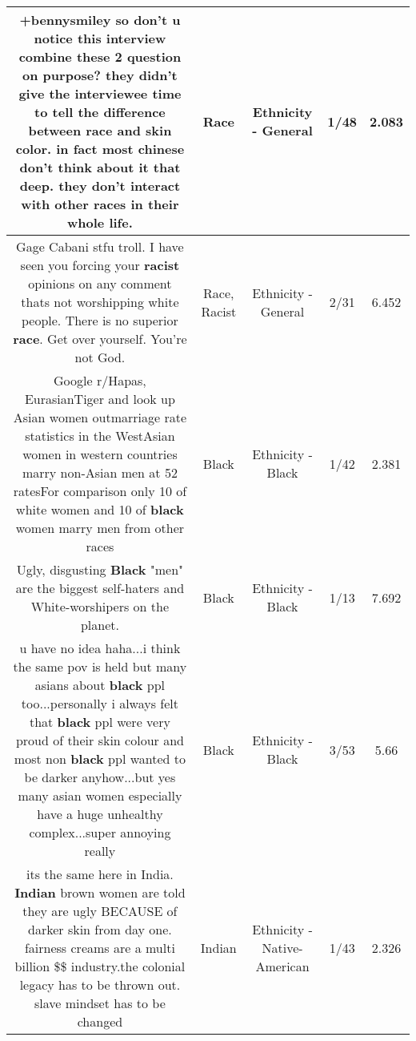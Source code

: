 \documentclass[11pt]{article}
\newlength\mylength
\begin{document}
\begin{center}
\begin{longtable}{|C{.65\mylength}|C{.30\mylength}|C{.12\mylength}|C{.12\mylength}|C{.12\mylength}|}
  \small +bennysmiley
    so don't u notice this interview combine these 2 question on purpose? they didn't give the interviewee time to tell the difference between \textbf{race} and skin color. in fact most chinese don't think about it that deep. they don't interact with other races in their whole life.\normalsize   & Race & Ethnicity - General & 1/48 & 2.083 \\  \hline
  \small Gage Cabani stfu troll. I have seen you forcing your \textbf{racist} opinions on any comment thats not worshipping white people. There is no superior \textbf{race}. Get over yourself.  You're not God.\normalsize   & Race, Racist & Ethnicity - General & 2/31 & 6.452 \\  \hline
  \small Google r/Hapas, EurasianTiger and look up Asian women outmarriage rate statistics in the WestAsian women in western countries marry non-Asian men at 52 ratesFor comparison only 10 of white women and 10 of \textbf{black} women marry men from other races\normalsize   & Black & Ethnicity - Black & 1/42 & 2.381 \\  \hline
  \small Ugly, disgusting \textbf{Black} "men" are the biggest self-haters and White-worshipers on the planet.\normalsize   & Black & Ethnicity - Black & 1/13 & 7.692 \\  \hline
  \small u have no idea haha...i think the same pov is held but many asians about \textbf{black} ppl too...personally i always felt that \textbf{black} ppl were very proud of their skin colour and most non \textbf{black} ppl wanted to be darker anyhow...but yes many asian women especially have a huge unhealthy complex...super annoying really\normalsize   & Black & Ethnicity - Black & 3/53 & 5.66 \\  \hline
  \small its the same here in India. \textbf{Indian} brown women are told they are ugly BECAUSE of darker skin from day one. fairness creams are a multi billion \$\$ industry.the colonial legacy has to be thrown out. slave mindset has to be changed\normalsize   & Indian & Ethnicity - Native-American & 1/43 & 2.326 \\  \hline

\end{longtable}
\end{center}
\end{document}
